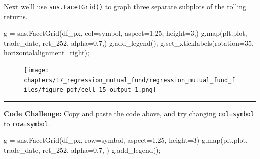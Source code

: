 \documentclass[
  letterpaper,
  DIV=11,
  numbers=noendperiod]{scrreprt}
\newenvironment{Shaded}{\begin{snugshade}}{\end{snugshade}}
\newcommand{\BuiltInTok}[1]{\textcolor[rgb]{0.00,0.23,0.31}{#1}}
\newcommand{\DecValTok}[1]{\textcolor[rgb]{0.68,0.00,0.00}{#1}}
\newcommand{\FloatTok}[1]{\textcolor[rgb]{0.68,0.00,0.00}{#1}}
\newcommand{\NormalTok}[1]{\textcolor[rgb]{0.00,0.23,0.31}{#1}}
\newcommand{\OperatorTok}[1]{\textcolor[rgb]{0.37,0.37,0.37}{#1}}
\newcommand{\StringTok}[1]{\textcolor[rgb]{0.13,0.47,0.30}{#1}}
\begin{document}
Next we'll use \texttt{sns.FacetGrid()} to graph three separate subplots
of the rolling returns.

\begin{Shaded}
\begin{Highlighting}[]
\NormalTok{g }\OperatorTok{=}\NormalTok{ sns.FacetGrid(df\_px, col}\OperatorTok{=}\StringTok{\textquotesingle{}symbol\textquotesingle{}}\NormalTok{, aspect}\OperatorTok{=}\FloatTok{1.25}\NormalTok{, height}\OperatorTok{=}\DecValTok{3}\NormalTok{,)}
\NormalTok{g.}\BuiltInTok{map}\NormalTok{(plt.plot, }\StringTok{\textquotesingle{}trade\_date\textquotesingle{}}\NormalTok{, }\StringTok{\textquotesingle{}ret\_252\textquotesingle{}}\NormalTok{, alpha}\OperatorTok{=}\FloatTok{0.7}\NormalTok{,)}
\NormalTok{g.add\_legend()}\OperatorTok{;}
\NormalTok{g.set\_xticklabels(rotation}\OperatorTok{=}\DecValTok{35}\NormalTok{, horizontalalignment}\OperatorTok{=}\StringTok{\textquotesingle{}right\textquotesingle{}}\NormalTok{)}\OperatorTok{;}
\end{Highlighting}
\end{Shaded}

\begin{figure}[H]

{\centering \texttt{[image: chapters/17\_regression\_mutual\_fund/regression\_mutual\_fund\_files/figure-pdf/cell-15-output-1.png]}

}

\end{figure}

\begin{center}\rule{0.5\linewidth}{0.5pt}\end{center}

\textbf{Code Challenge:} Copy and paste the code above, and try changing
\texttt{col=\textquotesingle{}symbol\textquotesingle{}} to
\texttt{row=\textquotesingle{}symbol\textquotesingle{}}.

\begin{Shaded}
\begin{Highlighting}[]
\NormalTok{g }\OperatorTok{=}\NormalTok{ sns.FacetGrid(df\_px, row}\OperatorTok{=}\StringTok{\textquotesingle{}symbol\textquotesingle{}}\NormalTok{, aspect}\OperatorTok{=}\FloatTok{1.25}\NormalTok{, height}\OperatorTok{=}\DecValTok{3}\NormalTok{)}
\NormalTok{g.}\BuiltInTok{map}\NormalTok{(plt.plot, }\StringTok{\textquotesingle{}trade\_date\textquotesingle{}}\NormalTok{, }\StringTok{\textquotesingle{}ret\_252\textquotesingle{}}\NormalTok{, alpha}\OperatorTok{=}\FloatTok{0.7}\NormalTok{, )}
\NormalTok{g.add\_legend()}\OperatorTok{;}
\end{Highlighting}
\end{Shaded}
\end{document}
